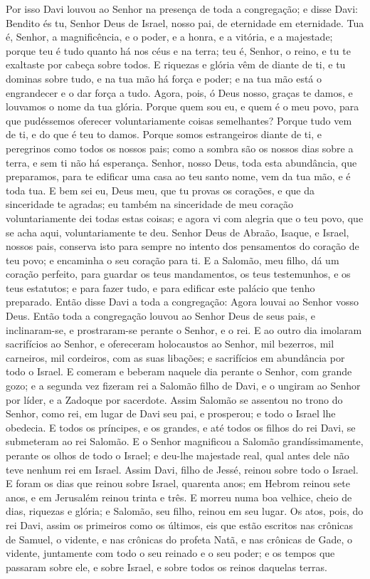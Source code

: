 Por isso Davi louvou ao Senhor na presença de toda a congregação;
e disse Davi: Bendito és tu, Senhor Deus de Israel, nosso pai, de
eternidade em eternidade. Tua é, Senhor, a magnificência, e o
poder, e a honra, e a vitória, e a majestade; porque teu é tudo
quanto há nos céus e na terra; teu é, Senhor, o reino, e tu te
exaltaste por cabeça sobre todos. E riquezas e glória vêm de
diante de ti, e tu dominas sobre tudo, e na tua mão há força e
poder; e na tua mão está o engrandecer e o dar força a tudo.
Agora, pois, ó Deus nosso, graças te damos, e louvamos o nome
da tua glória. Porque quem sou eu, e quem é o meu povo, para
que pudéssemos oferecer voluntariamente coisas semelhantes? Porque
tudo vem de ti, e do que é teu to damos. Porque somos
estrangeiros diante de ti, e peregrinos como todos os nossos pais;
como a sombra são os nossos dias sobre a terra, e sem ti não há
esperança. Senhor, nosso Deus, toda esta abundância, que
preparamos, para te edificar uma casa ao teu santo nome, vem da tua
mão, e é toda tua. E bem sei eu, Deus meu, que tu provas os
corações, e que da sinceridade te agradas; eu também na sinceridade
de meu coração voluntariamente dei todas estas coisas; e agora vi
com alegria que o teu povo, que se acha aqui, voluntariamente te
deu. Senhor Deus de Abraão, Isaque, e Israel, nossos pais,
conserva isto para sempre no intento dos pensamentos do coração de
teu povo; e encaminha o seu coração para ti. E a Salomão, meu
filho, dá um coração perfeito, para guardar os teus mandamentos, os
teus testemunhos, e os teus estatutos; e para fazer tudo, e para
edificar este palácio que tenho preparado. Então disse Davi a
toda a congregação: Agora louvai ao Senhor vosso Deus. Então toda a
congregação louvou ao Senhor Deus de seus pais, e inclinaram-se, e
prostraram-se perante o Senhor, e o rei. E ao outro dia
imolaram sacrifícios ao Senhor, e ofereceram holocaustos ao Senhor,
mil bezerros, mil carneiros, mil cordeiros, com as suas libações; e
sacrifícios em abundância por todo o Israel. E comeram e
beberam naquele dia perante o Senhor, com grande gozo; e a segunda
vez fizeram rei a Salomão filho de Davi, e o ungiram ao Senhor por
líder, e a Zadoque por sacerdote. Assim Salomão se assentou
no trono do Senhor, como rei, em lugar de Davi seu pai, e prosperou;
e todo o Israel lhe obedecia. E todos os príncipes, e os
grandes, e até todos os filhos do rei Davi, se submeteram ao rei
Salomão. E o Senhor magnificou a Salomão grandíssimamente,
perante os olhos de todo o Israel; e deu-lhe majestade real, qual
antes dele não teve nenhum rei em Israel. Assim Davi, filho
de Jessé, reinou sobre todo o Israel. E foram os dias que
reinou sobre Israel, quarenta anos; em Hebrom reinou sete anos, e em
Jerusalém reinou trinta e três. E morreu numa boa velhice,
cheio de dias, riquezas e glória; e Salomão, seu filho, reinou em
seu lugar. Os atos, pois, do rei Davi, assim os primeiros
como os últimos, eis que estão escritos nas crônicas de Samuel, o
vidente, e nas crônicas do profeta Natã, e nas crônicas de Gade, o
vidente, juntamente com todo o seu reinado e o seu poder; e
os tempos que passaram sobre ele, e sobre Israel, e sobre todos os
reinos daquelas terras.

